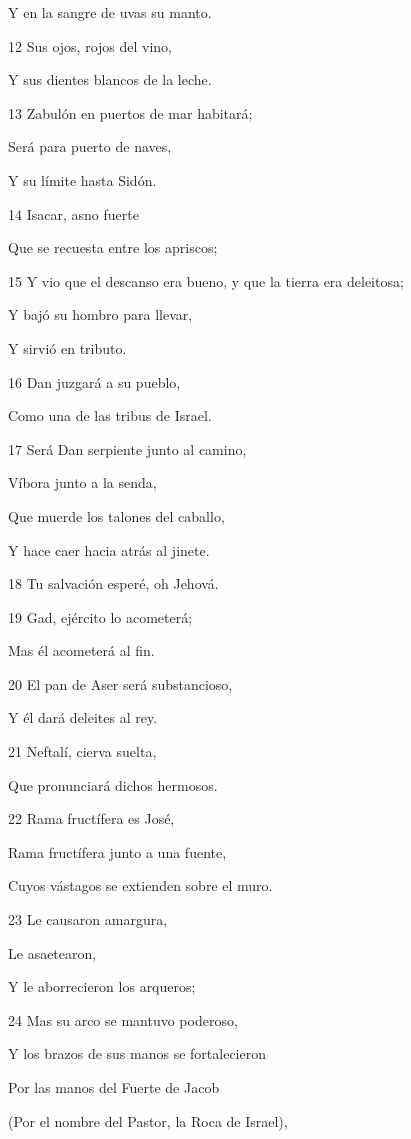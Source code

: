\par Y en la sangre de uvas su manto.
\par 12 Sus ojos, rojos del vino,
\par Y sus dientes blancos de la leche.
\par 13 Zabulón en puertos de mar habitará;
\par Será para puerto de naves,
\par Y su límite hasta Sidón.
\par 14 Isacar, asno fuerte
\par Que se recuesta entre los apriscos;
\par 15 Y vio que el descanso era bueno, y que la tierra era deleitosa;
\par Y bajó su hombro para llevar,
\par Y sirvió en tributo.
\par 16 Dan juzgará a su pueblo,
\par Como una de las tribus de Israel.
\par 17 Será Dan serpiente junto al camino,
\par Víbora junto a la senda,
\par Que muerde los talones del caballo,
\par Y hace caer hacia atrás al jinete.
\par 18 Tu salvación esperé, oh Jehová.
\par 19 Gad, ejército lo acometerá;
\par Mas él acometerá al fin.
\par 20 El pan de Aser será substancioso,
\par Y él dará deleites al rey.
\par 21 Neftalí, cierva suelta,
\par Que pronunciará dichos hermosos.
\par 22 Rama fructífera es José,
\par Rama fructífera junto a una fuente,
\par Cuyos vástagos se extienden sobre el muro.
\par 23 Le causaron amargura,
\par Le asaetearon,
\par Y le aborrecieron los arqueros;
\par 24 Mas su arco se mantuvo poderoso,
\par Y los brazos de sus manos se fortalecieron
\par Por las manos del Fuerte de Jacob
\par (Por el nombre del Pastor, la Roca de Israel),
